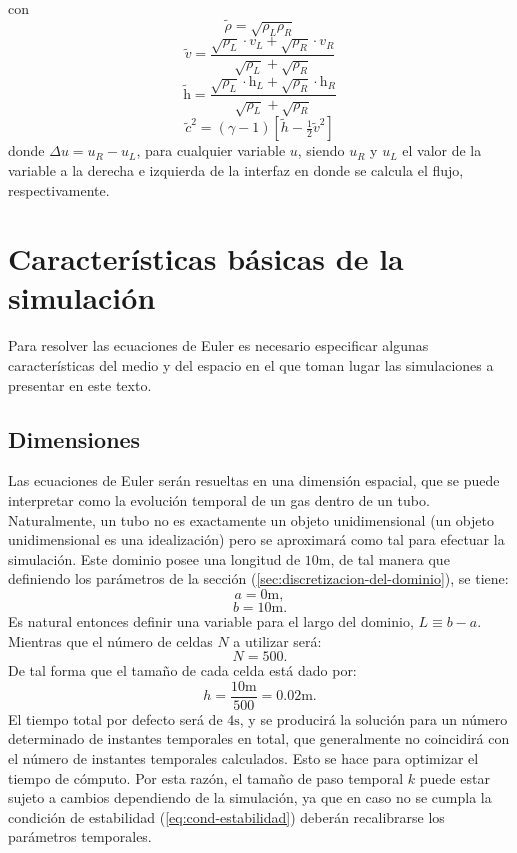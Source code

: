 con
\begin{equation}
	\tilde{\rho} = \sqrt{\rho_L \rho_R}
\end{equation}
\begin{equation}
	\tilde{v} = \frac{\sqrt{\rho_{L}}\cdot v_L + \sqrt{\rho_{R}}\cdot v_R}{\sqrt{\rho_{L}} + \sqrt{\rho_{R}}}
\end{equation}
\begin{equation}
	\tilde{\mathrm{h}} = \frac{\sqrt{\rho_{L}}\cdot \mathrm{h}_L + \sqrt{\rho_{R}}\cdot \mathrm{h}_R}{\sqrt{\rho_{L}} + \sqrt{\rho_{R}}}
\end{equation}
\begin{equation}
	\tilde{c}^{2} = (\gamma - 1)[\tilde{h} - \tfrac{1}{2}\tilde{v}^2]
\end{equation}
donde $\Delta u = u_R - u_L$, para cualquier variable $u$, siendo $u_R$ y $u_L$ el valor de la variable a la derecha e izquierda de la interfaz en donde se calcula el flujo, respectivamente.
\section{Características básicas de la simulación}
Para resolver las ecuaciones de Euler es necesario especificar algunas características del medio y  del espacio en el que toman lugar las simulaciones a presentar en este texto. 
\subsection{Dimensiones}
\label{sec:dimensiones}
Las ecuaciones de Euler serán resueltas en una dimensión espacial, que se puede interpretar como la evolución temporal de un gas dentro de un tubo. Naturalmente, un tubo no es exactamente un objeto unidimensional (un objeto unidimensional es una idealización) pero se aproximará como tal para efectuar la simulación. Este dominio posee una longitud de $10\unit{\meter}$, de tal manera que definiendo los parámetros de la sección (\ref{sec:discretizacion-del-dominio}), se tiene:
\begin{equation}
	a = 0 \unit{\meter},
\end{equation}
\begin{equation}
	b = 10 \unit{\meter}.
\end{equation}
Es natural entonces definir una variable para el largo del dominio, $L\equiv b-a$. Mientras que el número de celdas $N$ a utilizar será:
\begin{equation}
	N = 500.
\end{equation}
De tal forma que el tamaño de cada celda está dado por:
\begin{equation}
	h = \frac{10\unit{\meter}}{500} = 0.02 \unit{\meter}.
\end{equation}
El tiempo total por defecto será de $4\unit{\second}$, y se producirá la solución para un número determinado de instantes temporales en total, que generalmente no coincidirá con el número de instantes temporales calculados. Esto se hace para optimizar el tiempo de cómputo. Por esta razón, el tamaño de paso temporal $k$ puede estar sujeto a cambios dependiendo de la simulación, ya que en caso no se cumpla la condición de estabilidad (\ref{eq:cond-estabilidad}) deberán recalibrarse los parámetros temporales.

